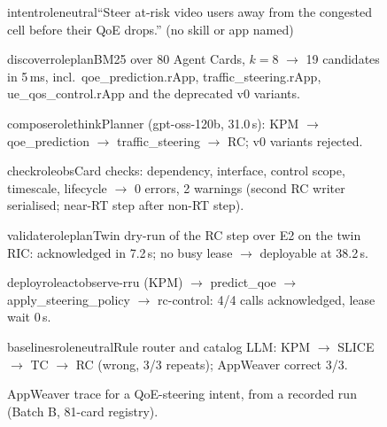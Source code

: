 \documentclass[conference]{IEEEtran}
\begin{document}
\begin{figure}[htbp]
\centering
\begin{awstep}{intent}{roleneutral}``Steer at-risk video users away from the congested cell before their QoE drops.'' (no skill or app named)\end{awstep}
\begin{awstep}{discover}{roleplan}BM25 over 80 Agent Cards, $k{=}8$ $\rightarrow$ 19 candidates in 5\,ms, incl.\ qoe\_prediction.rApp, traffic\_steering.rApp, ue\_qos\_control.rApp and the deprecated v0 variants.\end{awstep}
\begin{awstep}{compose}{rolethink}Planner (gpt-oss-120b, 31.0\,s): KPM $\rightarrow$ qoe\_prediction $\rightarrow$ traffic\_steering $\rightarrow$ RC; v0 variants rejected.\end{awstep}
\begin{awstep}{check}{roleobs}Card checks: dependency, interface, control scope, timescale, lifecycle $\rightarrow$ 0 errors, 2 warnings (second RC writer serialised; near-RT step after non-RT step).\end{awstep}
\begin{awstep}{validate}{roleplan}Twin dry-run of the RC step over E2 on the twin RIC: acknowledged in 7.2\,s; no busy lease $\rightarrow$ deployable at 38.2\,s.\end{awstep}
\begin{awstep}{deploy}{roleact}observe-rru (KPM) $\rightarrow$ predict\_qoe $\rightarrow$ apply\_steering\_policy $\rightarrow$ rc-control: 4/4 calls acknowledged, lease wait 0\,s.\end{awstep}
\begin{awstep}{baselines}{roleneutral}Rule router and catalog LLM: KPM $\rightarrow$ SLICE $\rightarrow$ TC $\rightarrow$ RC (wrong, 3/3 repeats); AppWeaver correct 3/3.\end{awstep}
\caption{AppWeaver trace for a QoE-steering intent, from a recorded run (Batch B, 81-card registry).}
\label{fig:trace}
\end{figure}
\end{document}
